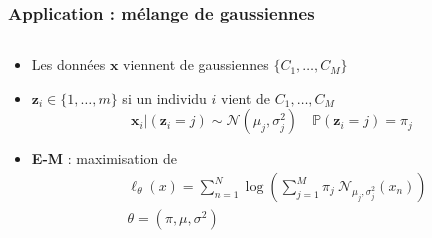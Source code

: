 \documentclass{presentation_template}
\begin{document}
\begin{frame}

\frametitle{Application : mélange de gaussiennes}

\vspace{-0.5cm}
\begin{columns}
    \begin{column}{0.7\textwidth}
        
        \begin{itemize}
            \item Les données $\mathbf{x}$ viennent de gaussiennes $\{ C_1,\ldots, C_M \}$ 
            \item $\boldsymbol{z}_{i} \in \{1,\ldots, m \}$ si un individu $i$ vient de $C_1, \ldots, C_M$
            $$ 
                \boldsymbol{x}_i |\left(\boldsymbol{z}_{i}=j\right) \sim \mathcal{N}\left(\mu_{j}, \sigma_{j}^{2}\right) \quad \mathbb{P}\left(\boldsymbol{z}_{i}=j\right)=\pi_{j} 
            $$
            \item \textbf{E-M} : maximisation de \\
            
            $$\begin{aligned}
                &\ell_{\theta}(x)=\sum_{n=1}^{N} \log \left(\sum_{j=1}^{M} \pi_{j}\ \mathcal{N}_{\mu_{j}, \sigma_{j}^2}\left(x_{n}\right)\right) \\
                &\theta=\left(\pi, \mu, \sigma^{2}\right) 
            \end{aligned} $$
        \end{itemize}
        

\end{column}
\end{columns}
\end{frame}
\end{document}
